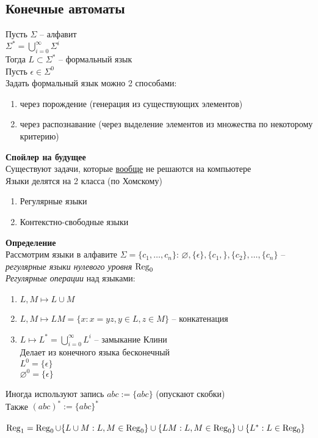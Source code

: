\documentclass[12pt]{article}
\begin{document}
\subsection{Конечные автоматы}
Пусть $\Sigma$ -- алфавит\\
$\Sigma^* = \bigcup_{i=0}^\infty \Sigma^i$\\
Тогда $L \subset \Sigma^*$ -- формальный язык\\
Пусть $\epsilon \in \Sigma^0$\\
Задать формальный язык можно 2 способами:
\begin{enumerate}
    \item через порождение (генерация из существующих элементов)
    \item через распознавание (через выделение элементов из множества по некоторому критерию)
\end{enumerate}
\textbf{Спойлер на будущее}\\
Существуют задачи, которые \ul{вообще} не решаются на компьютере\\
Языки делятся на 2 класса (по Хомскому)
\begin{enumerate}
    \item Регулярные языки
    \item Контекстно-свободные языки
\end{enumerate}
\textbf{Определение}\\
Рассмотрим языки в алфавите $\Sigma = \{ c_1, \ldots , c_n \}$: $\varnothing, \{ \epsilon \}, \{ c_1, \}, \{ c_2 \}, \ldots, \{c_n\}$ -- \textit{регулярные языки нулевого уровня} $\operatorname{Reg}_0$\\
\textit{Регулярные операции} над языками:
\begin{enumerate}
    \item $L, M \mapsto L \cup M$
    \item $L, M \mapsto LM = \{ x: x=yz, y \in L, z \in M \}$ -- конкатенация 
    \item $L \mapsto L^* = \bigcup_{i=0}^\infty L^i$ -- замыкание Клини\\
    Делает из конечного языка бесконечный\\
    $L^0 = \{ \epsilon \}$\\
    $\varnothing^0 = \{\epsilon\}$
\end{enumerate}
Иногда используют запись $abc:=\{abc\}$ (опускают скобки)\\
Также $(abc)^* := \{abc\}^*$\\\\
$\operatorname{Reg}_1 = \operatorname{Reg}_0 \cup\{L\cup  M: L,M \in \operatorname{Reg}_0\} \cup \{LM: L,M \in \operatorname{Reg}_0\} \cup \{L^*: L \in \operatorname{Reg}_0\}$\\
\end{document}
